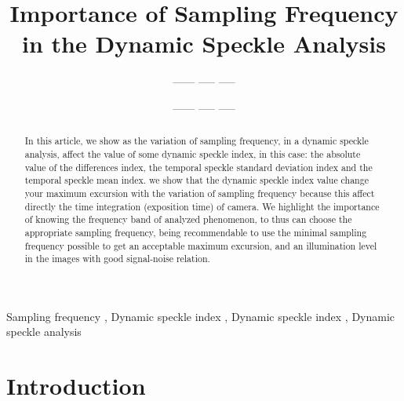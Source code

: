 \documentclass[review]{elsarticle}
\begin{document}
 

\begin{frontmatter}

\title{Importance of Sampling Frequency in the Dynamic Speckle Analysis}



\author{------ ----- -----}
\author{------ ----- -----}



\address{University Federal of Lavras, Lavras, Brazil}
% 


\begin{abstract}
In this article, we show as the variation of sampling frequency, 
in a dynamic speckle analysis, affect the value of some dynamic speckle index, 
in this case: the absolute value of the differences index, the temporal 
speckle standard deviation index and the temporal 
speckle mean index.
we show that  the dynamic speckle index value change your maximum excursion with 
the variation of sampling frequency because this affect directly the time integration 
(exposition time) of camera.
We highlight the importance of knowing  the frequency band of analyzed phenomenon, 
to thus can choose the appropriate sampling frequency, 
being recommendable to use the minimal sampling frequency possible
to get an acceptable maximum excursion, 
and an illumination level in the images with good signal-noise relation.

\end{abstract}

\begin{keyword}
Sampling frequency \sep
Dynamic speckle index \sep 
Dynamic speckle index \sep 
Dynamic speckle analysis
\end{keyword}

\end{frontmatter}

\linenumbers


\section{Introduction}
\end{document}
